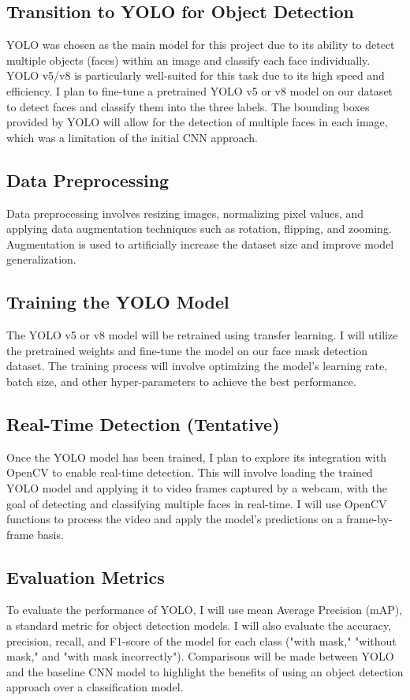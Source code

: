 \documentclass[11pt]{article}
\begin{document}
\subsection{Transition to YOLO for Object Detection} YOLO was chosen as the main model for this project due to its ability to detect multiple objects (faces) within an image and classify each face individually. YOLO v5/v8 is particularly well-suited for this task due to its high speed and efficiency. I plan to fine-tune a pretrained YOLO v5 or v8 model on our dataset to detect faces and classify them into the three labels. The bounding boxes provided by YOLO will allow for the detection of multiple faces in each image, which was a limitation of the initial CNN approach.

\subsection{Data Preprocessing} Data preprocessing involves resizing images, normalizing pixel values, and applying data augmentation techniques such as rotation, flipping, and zooming. Augmentation is used to artificially increase the dataset size and improve model generalization.

\subsection{Training the YOLO Model} The YOLO v5 or v8 model will be retrained using transfer learning. I will utilize the pretrained weights and fine-tune the model on our face mask detection dataset. The training process will involve optimizing the model's learning rate, batch size, and other hyper-parameters to achieve the best performance.

\subsection{Real-Time Detection (Tentative)} Once the YOLO model has been trained, I plan to explore its integration with OpenCV to enable real-time detection. This will involve loading the trained YOLO model and applying it to video frames captured by a webcam, with the goal of detecting and classifying multiple faces in real-time. I will use OpenCV functions to process the video and apply the model's predictions on a frame-by-frame basis.

\subsection{Evaluation Metrics} To evaluate the performance of YOLO, I will use mean Average Precision (mAP), a standard metric for object detection models. I will also evaluate the accuracy, precision, recall, and F1-score of the model for each class ("with mask," "without mask," and "with mask incorrectly"). Comparisons will be made between YOLO and the baseline CNN model to highlight the benefits of using an object detection approach over a classification model.
\end{document}
